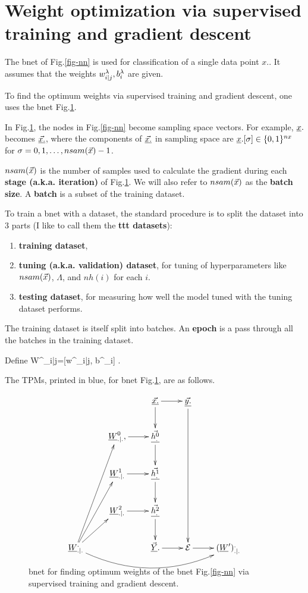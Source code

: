 \section{Weight
optimization via
supervised training and
gradient descent}

The bnet of Fig.\ref{fig-nn}
is used for classification
of a single data point $x.$.
It assumes that the
weights $w^\lambda_{i|j}, b_i^\lambda$
are given.

To find the optimum
weights via supervised
training and gradient descent,
one uses the bnet Fig.\ref{fig-nn-ext}.

In Fig.\ref{fig-nn-ext},
the nodes in
Fig.\ref{fig-nn} become
sampling space vectors.
For example, ${\underline{x}}.$ becomes
$\underline{\vec{x.}}$, where the
components of
$\underline{\vec{x.}}$ in sampling space are
${\underline{x}}.[\sigma]\in \{0,1\}^{nx}$
for $\sigma=0, 1, \ldots, nsam({\vec{x}})-1$.


$nsam({\vec{x}})$
is the number of
samples used to calculate the
gradient
during each {\bf stage (a.k.a. iteration)} of
Fig.\ref{fig-nn-ext}.
We will also  refer to
$nsam({\vec{x}})$ as the {\bf batch size}.
A {\bf batch} is a subset
of the training dataset.



To train a bnet with a dataset,
the standard procedure
is to split the dataset into 3 parts
(I like to call them the {\bf ttt datasets}):
\begin{enumerate}
\item
{\bf training dataset},
\item
{\bf tuning (a.k.a. validation) dataset}, for
tuning
of hyperparameters
like $nsam({\vec{x}})$,  $\Lambda$,
and $nh(i)$
for each $i$.
\item
{\bf testing dataset}, for measuring
how well the model
tuned with the tuning dataset
performs.
\end{enumerate}

The training dataset is
itself split into batches.
An {\bf epoch} is a pass through all
the batches in the training dataset.

Define
\beq
W^\lam_{i|j}=[w^\lam_{i|j}, b^\lam_i]
\;.
\eeq

The
TPMs,
printed in blue, for
 bnet
Fig.\ref{fig-nn-ext},
are as follows.

\begin{figure}[h!]
\centering
$$\xymatrix{
&&\ranvec{x.}\ar[d]\ar[r]&
\ranvec{y.}\ar[dddd]\\
&\rvW^0_{.|.}, \ar[r]&
\ranvec{h^0_.}\ar[d]\\
&\rvW^1_{.|.}\ar[r]&
\ranvec{h^1_.}\ar[d]\\
&\rvW^2_{.|.}\ar[r]&
\ranvec{h^2_.}\ar[d]\\
\rvW^._{.|.}\ar[ru]\ar[ruu]\ar[ruuu]
\ar@/_2pc/[rrrr]
&&
\vec{\rvY}.\ar[r]&\cale\ar[r]&
(\rvW')^._{.|.}
}$$
\caption{bnet
for
finding optimum
weights of the bnet
Fig.\ref{fig-nn} via
supervised training
and gradient descent.
}
\label{fig-nn-ext}
\end{figure}

